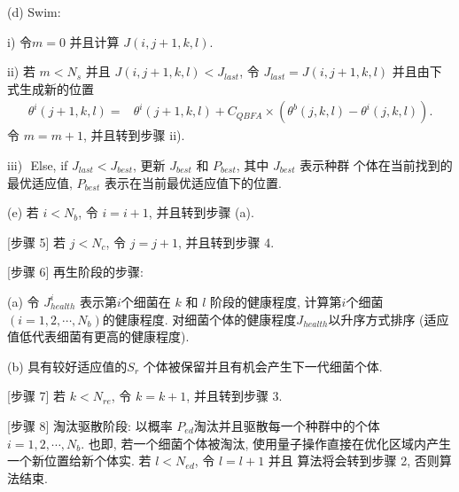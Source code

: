 \quad\quad (d) Swim:

\quad\quad \quad i) 令$m=0$ 并且计算 $J(i,j+1,k,l)$.

\quad\quad \quad ii) 若 $m<N_s$ 并且 $J(i, j+1, k, l)<J_{last}$, 令 $J_{last}=J(i, j+1, k, l)$ 并且由下式生成新的位置
\begin{align}
  \theta^i(j+1,k,l)=&\theta^i(j+1,k,l)+C_{QBFA}
  \times(\theta^b(j,k,l)-\theta^i(j,k,l)).
\end{align}
令 $m=m+1$, 并且转到步骤 ii).

\quad\quad \quad iii)\,\, \textcolor[rgb]{0,0,1}{Else, if} $J_{last}<J_{best}$, 更新 $J_{best}$ 和 $P_{best}$, 其中 $J_{best}$ 表示种群 个体在当前找到的最优适应值, $P_{best}$ 表示在当前最优适应值下的位置.

\quad\quad (e) 若 $i<N_b$, 令 $i=i+1$, 并且转到步骤 (a).

[步骤 5] 若 $j<N_c$, 令 $j=j+1$, 并且转到步骤 4.

[步骤 6] 再生阶段的步骤:

\quad\quad (a) 令 $J_{health}^i$ 表示第$i$个细菌在 $k$ 和 $l$ 阶段的健康程度, 计算第$i$个细菌 $(i=1, 2, \cdots, N_b)$的健康程度.
对细菌个体的健康程度$J_{health}$以升序方式排序 (适应值低代表细菌有更高的健康程度).

\quad\quad (b) 具有较好适应值的$S_r$ 个体被保留并且有机会产生下一代细菌个体.

[步骤 7] 若 $k<N_{re}$, 令 $k=k+1$, 并且转到步骤 3.

[步骤 8] 淘汰驱散阶段: 以概率 $P_{ed}$淘汰并且驱散每一个种群中的个体 $i=1,2,\cdots, N_b$. 也即, 若一个细菌个体被淘汰, 使用量子操作直接在优化区域内产生一个新位置给新个体实.
若 $l<N_{ed}$, 令 $l=l+1$ 并且 算法将会转到步骤 2, 否则算法结束.

